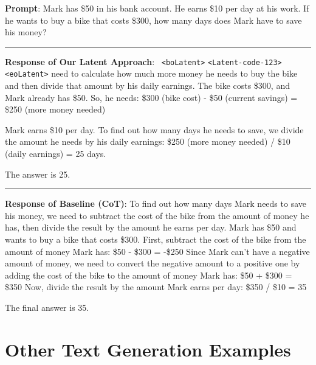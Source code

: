 \begin{tcolorbox}[title=Question 2, colback=white]
\textbf{Prompt}: Mark has \$50 in his bank account. He earns \$10 per day at his work. If he wants to buy a bike that costs \$300, how many days does Mark have to save his money? \\
\noindent\rule{\textwidth}{0.5pt}
\textbf{Response of Our Latent Approach}: \
\verb|<boLatent>| \verb|<Latent-code-123>| \verb|<eoLatent>|   need to calculate how much more money he needs to buy the bike and then divide that amount by his daily earnings. The bike costs \$300, and Mark already has \$50. So, he needs: \$300 (bike cost) - \$50 (current savings) = \$250 (more money needed)

Mark earns \$10 per day. To find out how many days he needs to save, we divide the amount he needs by his daily earnings: \$250 (more money needed) / \$10 (daily earnings) = 25 days.

The answer is 25.


\noindent\rule{\textwidth}{0.5pt} %
\textbf{Response of Baseline (CoT)}: To find out how many days Mark needs to save his money, we need to subtract the cost of the bike from the amount of money he has, then divide the result by the amount he earns per day.
Mark has \$50 and wants to buy a bike that costs \$300.
First, subtract the cost of the bike from the amount of money Mark has:
\$50 - \$300 = -\$250
Since Mark can't have a negative amount of money, we need to convert the negative amount to a positive one by adding the cost of the bike to the amount of money Mark has:
\$50 + \$300 = \$350
Now, divide the result by the amount Mark earns per day:
\$350 / \$10 = 35

The final answer is 35.
\end{tcolorbox}



\section{Other Text Generation Examples}
\label{app:generated_text_others}

